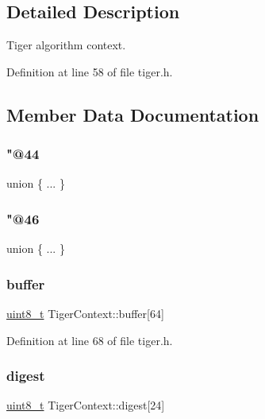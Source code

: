 \subsection{Detailed Description}
Tiger algorithm context. 

Definition at line 58 of file tiger.\+h.



\subsection{Member Data Documentation}
\mbox{\label{structTigerContext_ab68e5cf7c60f3e4f2cd0367a189d8efb}} 
\subsubsection{\texorpdfstring{"@44}{@44}}
{\footnotesize\ttfamily union \{ ... \} }

\mbox{\label{structTigerContext_aa1e08bd450ea20f3bdc64dace98e06db}} 
\subsubsection{\texorpdfstring{"@46}{@46}}
{\footnotesize\ttfamily union \{ ... \} }

\mbox{\label{structTigerContext_ad927797ce2825ae62c485d5bd912cf43}} 
\subsubsection{\texorpdfstring{buffer}{buffer}}
{\footnotesize\ttfamily \hyperlink{stdint_8h_aba7bc1797add20fe3efdf37ced1182c5}{uint8\+\_\+t} Tiger\+Context\+::buffer\mbox{[}64\mbox{]}}



Definition at line 68 of file tiger.\+h.

\mbox{\label{structTigerContext_a6fcc8a58aa0d1dc1ffc3d6892ee5b834}} 
\subsubsection{\texorpdfstring{digest}{digest}}
{\footnotesize\ttfamily \hyperlink{stdint_8h_aba7bc1797add20fe3efdf37ced1182c5}{uint8\+\_\+t} Tiger\+Context\+::digest\mbox{[}24\mbox{]}}



